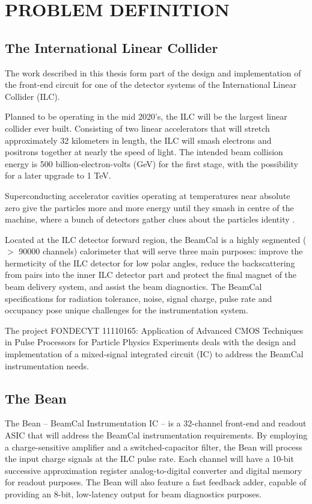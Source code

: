 \chapter{PROBLEM DEFINITION}
\label{chapter:problem}
\section{The International Linear Collider}

The work described in this thesis form part of the design and implementation of the front-end circuit for one of the detector systems of the International Linear Collider (ILC).

Planned to be operating in the mid 2020’s, the ILC will be the largest linear collider ever built. Consisting of two linear accelerators that will stretch approximately 32 kilometers in length, the ILC will smash electrons and positrons together at nearly the speed of light. The intended beam collision energy is 500 billion-electron-volts (GeV) for the first stage, with the possibility for a later upgrade to 1 TeV. 




Superconducting accelerator cavities operating at temperatures near absolute zero give the particles more and more energy until they smash in centre of the machine, where a bunch of detectors gather clues about the particles identity .
 
Located at the ILC detector forward region, the BeamCal is a highly segmented ($>$ 90000 channels) calorimeter that will serve three main purposes: improve the hermeticity of the ILC detector for low polar angles, reduce the backscattering from pairs into the inner ILC detector part and protect the final magnet of the beam delivery system, and assist the beam diagnostics. The BeamCal specifications for radiation tolerance, noise, signal charge, pulse rate and occupancy pose unique challenges for the instrumentation system.

The project FONDECYT 11110165: Application of Advanced CMOS Techniques in Pulse Processors for Particle Physics Experiments deals with the design and implementation of a mixed-signal integrated circuit (IC) to address the BeamCal instrumentation needs.

\section{The Bean}
The Bean – BeamCal Instrumentation IC – is a 32-channel front-end and readout ASIC that will address the BeamCal instrumentation requirements. By employing a charge-sensitive amplifier and a switched-capacitor filter, the Bean will process the input charge signals at the ILC pulse rate. Each channel will have a 10-bit successive approximation register analog-to-digital converter and digital memory for readout purposes. The Bean will also feature a fast feedback adder, capable of providing an 8-bit, low-latency output for beam diagnostics purposes.

